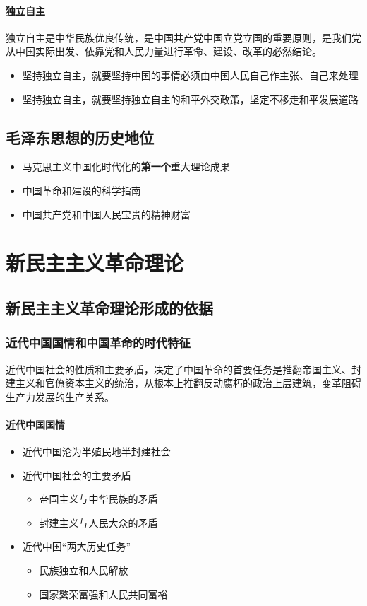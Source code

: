 \documentclass[12pt,openany]{ctexbook}
\begin{document}
\subsubsection{独立自主}
独立自主是中华民族优良传统，是中国共产党中国立党立国的重要原则，是我们党从中国实际出发、依靠党和人民力量进行革命、建设、改革的必然结论。
\begin{itemize}
  \item 坚持独立自主，就要坚持中国的事情必须由中国人民自己作主张、自己来处理
  \item 坚持独立自主，就要坚持独立自主的和平外交政策，坚定不移走和平发展道路
\end{itemize}
\section{毛泽东思想的历史地位}
\begin{itemize}
  \item 马克思主义中国化时代化的\textbf{第一个}重大理论成果
  \item 中国革命和建设的科学指南
  \item 中国共产党和中国人民宝贵的精神财富
\end{itemize}
\chapter{新民主主义革命理论}
\section{新民主主义革命理论形成的依据}
\subsection{近代中国国情和中国革命的时代特征}
近代中国社会的性质和主要矛盾，决定了中国革命的首要任务是推翻帝国主义、封建主义和官僚资本主义的统治，从根本上推翻反动腐朽的政治上层建筑，变革阻碍生产力发展的生产关系。
\subsubsection{近代中国国情}
\begin{itemize}
  \item 近代中国沦为半殖民地半封建社会
  \item 近代中国社会的主要矛盾
\begin{itemize}
  \item 帝国主义与中华民族的矛盾
  \item 封建主义与人民大众的矛盾
\end{itemize}
  \item 近代中国“两大历史任务”
\begin{itemize}
  \item 民族独立和人民解放
  \item 国家繁荣富强和人民共同富裕
\end{itemize}
\end{itemize}
\end{document}
